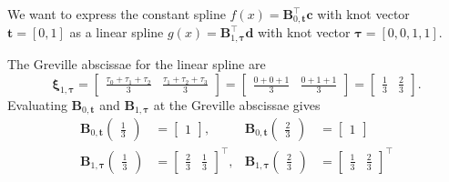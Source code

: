 \begin{indentedexample}
    We want to express the constant spline $f(x) =\mathbf B_{0, \mathbf t}^\top\mathbf c$ with knot vector $\mathbf t = \left[0, 1\right]$ as a linear spline $g(x) = \mathbf B_{1, \boldsymbol \tau}^\top \mathbf d$ with knot vector $\boldsymbol \tau = \left[0, 0, 1, 1\right]$. 

    The Greville abscissae for the linear spline are 
    \begin{equation*}
        \boldsymbol \xi_{1,\boldsymbol \tau} = 
        \begin{bmatrix}
            \frac{\tau_0 + \tau_1 + \tau_2}{3} &
            \frac{\tau_1 + \tau_2 + \tau_3}{3} 
        \end{bmatrix}
        =
        \begin{bmatrix}
            \frac{0 + 0 + 1}{3} & \frac{0 + 1 + 1}{3}
        \end{bmatrix} = \begin{bmatrix}
            \frac{1}{3} & \frac{2}{3}
        \end{bmatrix}.
    \end{equation*}
    Evaluating $\mathbf B_{0, \mathbf t}$ and $\mathbf B_{1, \boldsymbol \tau}$  at the Greville abscissae gives
    \begin{equation*}
        \begin{aligned}
            \mathbf B_{0, \mathbf t}\begin{pmatrix}\frac{1}{3}\end{pmatrix} &= \begin{bmatrix} 1 \end{bmatrix}, 
            &\mathbf B_{0, \mathbf t}\begin{pmatrix}\frac{2}{3}\end{pmatrix} &= \begin{bmatrix} 1 \end{bmatrix} 
            \\
            \mathbf B_{1, \boldsymbol \tau}\begin{pmatrix}\frac{1}{3}\end{pmatrix} &= \begin{bmatrix} \frac{2}{3} & \frac{1}{3} \end{bmatrix}^\top, 
            &\mathbf B_{1, \boldsymbol \tau}\begin{pmatrix}\frac{2}{3}\end{pmatrix} &= \begin{bmatrix} \frac{1}{3} & \frac{2}{3} \end{bmatrix}^\top

\end{aligned}
\end{equation*}
\end{indentedexample}
